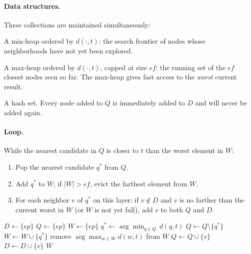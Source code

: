 \documentclass[11pt]{article}
\newcommand{\eps}{\mathit{ep}}
\newcommand{\ef}{\mathit{ef}}
\theoremstyle{definition}
\begin{document}
\paragraph{Data structures.} Three collections are maintained simultaneously:
\begin{description}[leftmargin=2em]
  \item[$Q$ (candidates)] A min-heap ordered by $d(\cdot, t)$: the search frontier of nodes whose neighborhoods have not yet been explored.
  \item[$W$ (result set)] A max-heap ordered by $d(\cdot, t)$, capped at size $\ef$: the running set of the $\ef$ closest nodes seen so far. The max-heap gives fast access to the \emph{worst} current result.
  \item[$D$ (visited)] A hash set. Every node added to $Q$ is immediately added to $D$ and will never be added again.
\end{description}

\paragraph{Loop.} While the nearest candidate in $Q$ is closer to $t$ than the worst element in $W$:
\begin{enumerate}
  \item Pop the nearest candidate $q^*$ from $Q$.
  \item Add $q^*$ to $W$; if $|W| > \ef$, evict the farthest element from $W$.
  \item For each neighbor $v$ of $q^*$ on this layer: if $v \notin D$ and $v$ is no farther than the current worst in $W$ (or $W$ is not yet full), add $v$ to both $Q$ and $D$.
\end{enumerate}

\begin{algorithm}
\caption{\textsc{beam-search} --- single-layer beam search}
\begin{algorithmic}[1]
\Function{beam-search}{$t, \eps, \ell, \ef$}
  \State $D \gets \{\eps\}$ 
  \State $Q \gets \{\eps\}$ 
  \State $W \gets \{\eps\}$ 
    \State $q^* \gets \arg\min_{q \in Q}\, d(q, t)$
    \State $Q \gets Q \setminus \{q^*\}$
    \State $W \gets W \cup \{q^*\}$
    \If{$|W| > \ef$}
      \State remove $\arg\max_{w \in W} d(w, t)$ from $W$
    \EndIf
        \State $Q \gets Q \cup \{v\}$
        \State $D \gets D \cup \{v\}$
      \EndIf
    \EndFor
  \EndWhile
  \State \Return $W$
\EndFunction
\end{algorithmic}
\end{algorithm}
\end{document}
